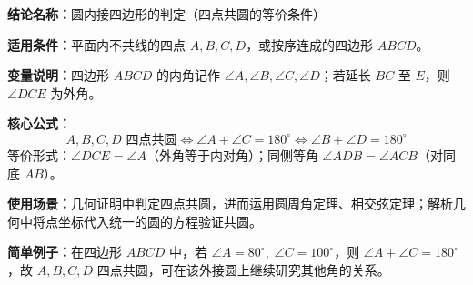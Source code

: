 \textbf{结论名称：}圆内接四边形的判定（四点共圆的等价条件）

\textbf{适用条件：}平面内不共线的四点 \(A,B,C,D\)，或按序连成的四边形 \(ABCD\)。

\textbf{变量说明：}四边形 \(ABCD\) 的内角记作 \(\angle A,\angle B,\angle C,\angle D\)；若延长 \(BC\) 至 \(E\)，则 \(\angle DCE\) 为外角。

\textbf{核心公式：}
\[
\boxed{A,B,C,D\text{ 四点共圆} \iff \angle A+\angle C=180^\circ \iff \angle B+\angle D=180^\circ}
\]
等价形式：\(\angle DCE=\angle A\)（外角等于内对角）；同侧等角 \(\angle ADB=\angle ACB\)（对同底 \(AB\)）。

\textbf{使用场景：}几何证明中判定四点共圆，进而运用圆周角定理、相交弦定理；解析几何中将点坐标代入统一的圆的方程验证共圆。

\textbf{简单例子：}在四边形 \(ABCD\) 中，若 \(\angle A=80^\circ,\;\angle C=100^\circ\)，则 \(\angle A+\angle C=180^\circ\)，故 \(A,B,C,D\) 四点共圆，可在该外接圆上继续研究其他角的关系。